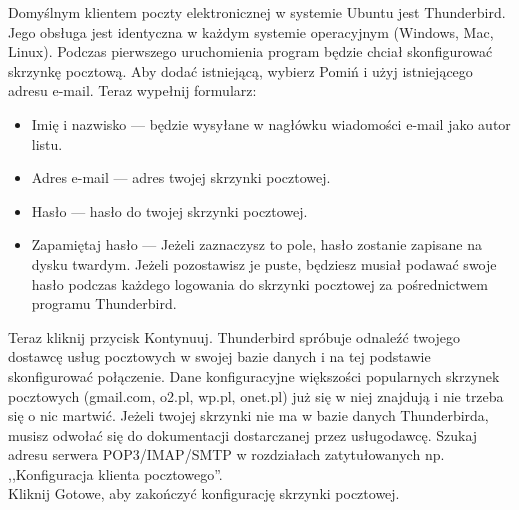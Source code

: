 Domyślnym klientem poczty elektronicznej w systemie Ubuntu jest Thunderbird. Jego obsługa jest identyczna w każdym systemie operacyjnym (Windows, Mac, Linux). Podczas pierwszego uruchomienia program będzie chciał skonfigurować skrzynkę pocztową. Aby dodać istniejącą, wybierz \textcolor{ubuntu_orange}{Pomiń i użyj istniejącego adresu e-mail}. Teraz wypełnij formularz:
\begin{itemize}
\item \textcolor{ubuntu_orange}{Imię i nazwisko} --- będzie wysyłane w nagłówku wiadomości e-mail jako autor listu.
\item \textcolor{ubuntu_orange}{Adres e-mail} --- adres twojej skrzynki pocztowej.
\item \textcolor{ubuntu_orange}{Hasło} --- hasło do twojej skrzynki pocztowej.
\item \textcolor{ubuntu_orange}{Zapamiętaj hasło} --- Jeżeli zaznaczysz to pole, hasło zostanie zapisane na dysku twardym. Jeżeli pozostawisz je puste, będziesz musiał podawać swoje hasło podczas każdego logowania do skrzynki pocztowej za pośrednictwem programu Thunderbird.
\end{itemize}

Teraz kliknij przycisk \textcolor{ubuntu_orange}{Kontynuuj}. Thunderbird spróbuje odnaleźć twojego dostawcę usług pocztowych w swojej bazie danych i na tej podstawie skonfigurować połączenie. Dane konfiguracyjne większości popularnych skrzynek pocztowych (gmail.com, o2.pl, wp.pl, onet.pl) już się w niej znajdują i nie trzeba się o nic martwić. Jeżeli twojej skrzynki nie ma w bazie danych Thunderbirda, musisz odwołać się do dokumentacji dostarczanej przez usługodawcę. Szukaj adresu serwera POP3/IMAP/SMTP w rozdziałach zatytułowanych np. ,,Konfiguracja klienta pocztowego''.\\
Kliknij \textcolor{ubuntu_orange}{Gotowe}, aby zakończyć konfigurację skrzynki pocztowej.

